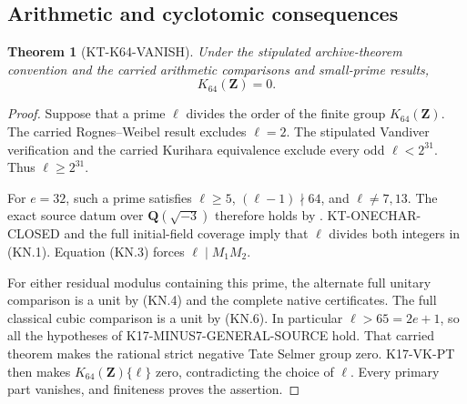 \documentclass[11pt,a4paper]{article}
\newtheorem{theorem}{Theorem}[section]
\theoremstyle{definition}
\begin{document}
\subsection{Arithmetic and cyclotomic consequences}

\begin{theorem}[KT-K64-VANISH]
\label{thm:kt-k64-vanish}
Under the stipulated archive-theorem convention and the carried
arithmetic comparisons and small-prime results,
\[
                              K_{64}(\mathbf Z)=0.
\]
\end{theorem}
\begin{proof}
Suppose that a prime $\ell$ divides the order of the finite
group $K_{64}(\mathbf Z)$.  The carried Rognes--Weibel result
excludes $\ell=2$.  The stipulated Vandiver verification and
the carried Kurihara equivalence exclude every odd
$\ell<2^{31}$.  Thus $\ell\geq2^{31}$.

For $e=32$, such a prime satisfies $\ell\geq5$,
$(\ell-1)\nmid64$, and $\ell\ne7,13$.  The exact source
datum over $\mathbf Q(\sqrt{-3})$ therefore holds by
.  KT-ONECHAR-CLOSED and
the full initial-field coverage imply that $\ell$ divides
both integers in (KN.1).  Equation (KN.3) forces
$\ell\mid M_1M_2$.

For either residual modulus containing this prime, the
alternate full unitary comparison is a unit by (KN.4)
and the complete native certificates.  The full classical
cubic comparison is a unit by (KN.6).  In particular
$\ell>65=2e+1$, so all the hypotheses of
K17-MINUS7-GENERAL-SOURCE hold.  That carried theorem makes
the rational strict negative Tate Selmer group zero.
K17-VK-PT then makes $K_{64}(\mathbf Z)\{\ell\}$ zero,
contradicting the choice of $\ell$.  Every primary part
vanishes, and finiteness proves the assertion.
\end{proof}
\end{document}
